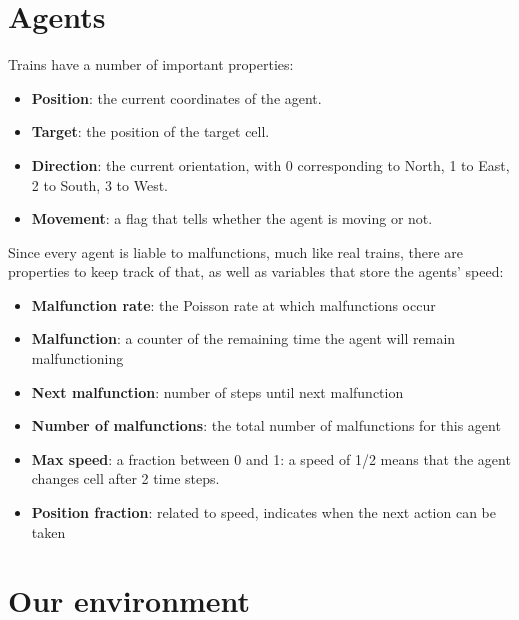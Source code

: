 \section{Agents}
Trains have a number of important properties:
\begin{itemize}
\item \textbf{Position}: the current coordinates of the agent.
\item \textbf{Target}: the position of the target cell.
\item \textbf{Direction}: the current orientation, with 0 corresponding to North, 1 to East, 2 to South, 3 to West. 
\item \textbf{Movement}: a flag that tells whether the agent is moving or not.
\end{itemize}
\noindent
Since every agent is liable to malfunctions, much like real trains, there are properties to keep track of that, as well as variables that store the agents' speed:
\begin{itemize}
\item 	\textbf{Malfunction rate}: the Poisson rate at which malfunctions occur
\item \textbf{Malfunction}: a counter of the remaining time the agent will remain malfunctioning
\item \textbf{Next malfunction}: number of steps until next malfunction
\item \textbf{Number of malfunctions}: the total number of malfunctions for this agent
\item \textbf{Max speed}: a fraction between 0 and 1: a speed of 1/2 means that the agent changes cell after 2 time steps.
\item \textbf{Position fraction}: related to speed, indicates when the next action can be taken
\end{itemize}

\section{Our environment}